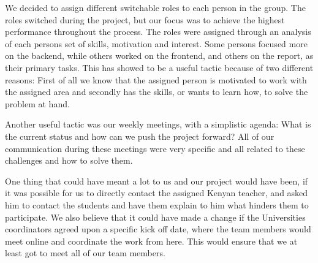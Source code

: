 We decided to assign different switchable roles to each person in the group. The roles switched during the project, but our focus was to achieve the highest performance throughout the process. The roles were assigned through an analysis of each persons set of skills, motivation and interest. Some persons focused more on the backend, while others worked on the frontend, and others on the report, as their primary tasks. This has showed to be a useful tactic because of two different reasons: First of all we know that the assigned person is motivated to work with the assigned area and secondly has the skills, or wants to learn how, to solve the problem at hand.

Another useful tactic was our weekly meetings, with a simplistic agenda: What is the current status and how can we push the project forward? All of our communication during these meetings were very specific and all related to these challenges and how to solve them. 

One thing that could have meant a lot to us and our project would have been, if it was possible for us to directly contact the assigned Kenyan teacher, and asked him to contact the students and have them explain to him what hinders them to participate. We also believe that it could have made a change if the Universities coordinators agreed upon a specific kick off date, where the team members would meet online and coordinate the work from here. This would ensure that we at least got to meet all of our team members. 





